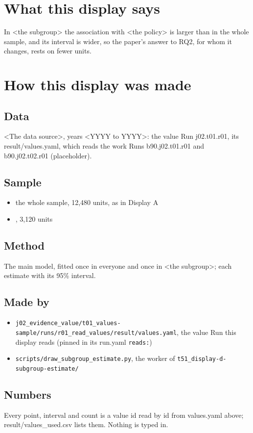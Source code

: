 \documentclass[12pt]{article}
\begin{document}
\makeatletter\renewcommand{\fps@figure}{H}\renewcommand{\fps@table}{H}\makeatother
\renewcommand{\figurename}{eFigure}\renewcommand{\tablename}{eTable}\renewcommand{\thefigure}{2}\renewcommand{\thetable}{2}
{}
\clearpage
\section*{What this display says}
In <the subgroup> the association with <the policy> is larger than in the whole sample, and its interval is wider, so the paper's answer to RQ2, for whom it changes, rests on fewer units.

\section*{How this display was made}
\subsection*{Data}
<The data source>, years <YYYY to YYYY>: the value Run j02.t01.r01, its result/values.yaml, which reads the work Runs b90.j02.t01.r01 and b90.j02.t02.r01 (placeholder).

\subsection*{Sample}
\begin{itemize}\item the whole sample, 12,480 units, as in Display A
\item <the subgroup>, 3,120 units
\end{itemize}
\subsection*{Method}
The main model, fitted once in everyone and once in <the subgroup>; each estimate with its 95\% interval.

\subsection*{Made by}
\begin{itemize}\item \texttt{j02\_evidence\_value/t01\_values-sample/runs/r01\_read\_values/result/values.yaml}, the value Run this display reads (pinned in its run.yaml \texttt{reads:})
\item \texttt{scripts/draw\_subgroup\_estimate.py}, the worker of \texttt{t51\_display-d-subgroup-estimate/}
\end{itemize}
\subsection*{Numbers}
Every point, interval and count is a value id read by id from values.yaml above; result/values\_used.csv lists them. Nothing is typed in.
\end{document}
